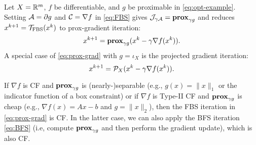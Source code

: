 {\begin{example}\label{alg:prox-grad} Let $X=\mathbb{R}^m$, $f$ be differentiable, and $g$ be proximable in \eqref{eq:opt-example}. Setting ${\mathcal{A}}=\partial g$ and ${\mathcal{C}}=\nabla f$ in \eqref{eq:FBS} gives ${\mathcal{J}}_{\gamma {\mathcal{A}}}=\mathbf{prox}_{\gamma g}$ and reduces $x^{k+1}={{\mathcal{T}}_{\mathrm{FBS}}}(x^k)$ to prox-gradient iteration: 
\begin{equation}\label{eq:prox-grad}x^{k+1}=\prox_{\gamma g}(x^k-\gamma\nabla f(x^k)).
\end{equation}
A special case of \eqref{eq:prox-grad} with $g=\iota_X$ is the projected gradient iteration:
\begin{equation}\label{eq:proj-grad}
x^{k+1}=\cP_X(x^k-\gamma \nabla f(x^k)).
\end{equation}

If $\nabla f$ is CF and $\mathbf{prox}_{\gamma g}$ is (nearly-)separable (e.g., $g(x)=\|x\|_1$ or the indicator function of a box constraint) or if $\nabla f$ is Type-II CF and $\mathbf{prox}_{\gamma g}$ is cheap (e.g., $\nabla f(x)=Ax-b$ and $g=\|x\|_2$), then the FBS iteration in \eqref{eq:prox-grad} is CF. In the latter case, we can also apply the BFS iteration \eqref{eq:BFS} (i.e,  compute $\mathbf{prox}_ {\gamma g}$ and then perform the gradient update), which is also CF.

\end{example}


}
